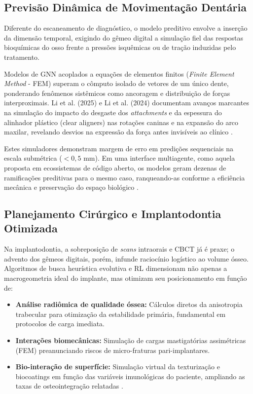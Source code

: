 
\subsection{Previsão Dinâmica de Movimentação Dentária}
\label{subsec:previsao-movimentacao}

Diferente do escaneamento de diagnóstico, o modelo preditivo envolve a inserção da dimensão temporal, exigindo do gêmeo digital a simulação fiel das respostas bioquímicas do osso frente a pressões isquêmicas ou de tração induzidas pelo tratamento. 

Modelos de GNN acoplados a equações de elementos finitos (\textit{Finite Element Method} - FEM) superam o cômputo isolado de vetores de um único dente, ponderando fenômenos sistêmicos como ancoragem e distribuição de forças interproximais. Li et al. (2025) e Li et al. (2024) documentam avanços marcantes na simulação do impacto do desgaste dos \textit{attachments} e da espessura do alinhador plástico (clear aligners) nas rotações caninas e na expansão do arco maxilar, revelando desvios na expressão da força antes invisíveis ao clínico \cite{li2025, li2024}.

Estes simuladores demonstram margem de erro em predições sequenciais na escala submétrica ($<0,5$ mm). Em uma interface multiagente, como aquela proposta em ecossistemas de código aberto, os modelos geram dezenas de ramificações preditivas para o mesmo caso, ranqueando-as conforme a eficiência mecânica e preservação do espaço biológico \cite{zhang2024recursive}.

\subsection{Planejamento Cirúrgico e Implantodontia Otimizada}
\label{subsec:implantes}

Na implantodontia, a sobreposição de \textit{scans} intraorais e CBCT já é praxe; o advento dos gêmeos digitais, porém, infunde raciocínio logístico ao volume ósseo. Algoritmos de busca heurística evolutiva e RL dimensionam não apenas a macrogeometria ideal do implante, mas otimizam seu posicionamento em função de:
\begin{itemize}
\item \textbf{Análise radiômica de qualidade óssea:} Cálculos diretos da anisotropia trabecular para otimização da estabilidade primária, fundamental em protocolos de carga imediata.
\item \textbf{Interações biomecânicas:} Simulação de cargas mastigatórias assimétricas (FEM) preanunciando riscos de micro-fraturas pari-implantares.
\item \textbf{Bio-interação de superfície:} Simulação virtual da texturização e biocoatings em função das variáveis imunológicas do paciente, ampliando as taxas de osteointegração relatadas \cite{alshadidi2024}.
\end{itemize}

